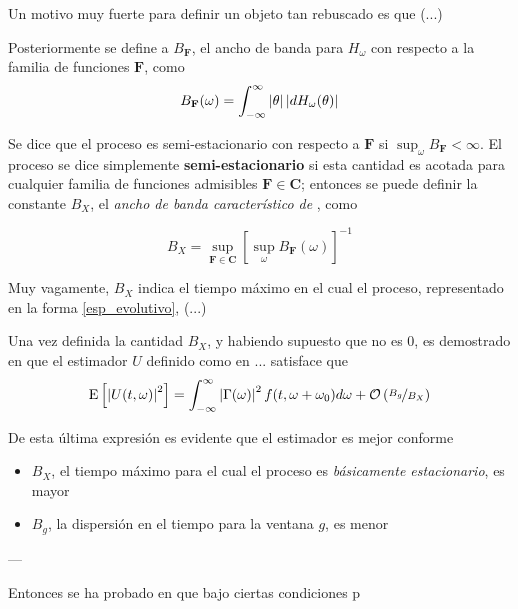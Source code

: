 Un motivo muy fuerte para definir un objeto tan rebuscado es que (...)

Posteriormente se define a $B_{\mathbf{F}}$, el ancho de banda para $H_\omega$ con respecto a la 
familia de funciones $\mathbf{F}$, como
%
\begin{equation}
B_{\mathbf{F}}(\omega) = \int_{-\infty}^{\infty} \left| \theta \right| \left| dH_\omega(\theta) \right|
\end{equation}

Se dice que el proceso es semi-estacionario con respecto a $\mathbf{F}$ si 
$\sup_\omega B_{\mathbf{F}} < \infty$. El proceso se dice simplemente \textbf{semi-estacionario} 
si esta cantidad es acotada para cualquier familia de funciones admisibles 
$\mathbf{F} \in \mathbf{C}$; entonces se puede definir la constante $B_X$, el \textit{ancho de 
banda característico de} \xt, como

\begin{equation}
B_X = \sup_{\mathbf{F}\in \mathbf{C}} \left[ \sup_\omega B_{\mathbf{F}}(\omega) \right]^{-1}
\end{equation}

Muy vagamente, $B_X$ indica el tiempo máximo en el cual el proceso, representado en la forma
\ref{esp_evolutivo}, (...)

Una vez definida la cantidad $B_X$, y habiendo supuesto que no es 0, es demostrado en 
\cite{Priestley65} que el estimador $U$ definido como en ... satisface que
%
\begin{equation}
\mathrm{E}\left[ \left| U(t,\omega) \right|^{2} \right] = \int_{-\infty}^{\infty} \left| \Gamma(\omega) \right|^{2} f(t,\omega+\omega_0) d\omega
+ \mathcal{O}\left( \nicefrac{B_g}{B_X} \right)
\end{equation}

De esta última expresión es evidente que el estimador es mejor conforme 
\begin{itemize}
\item  $B_X$, el tiempo máximo para el cual el proceso es \textit{básicamente estacionario}, es 
mayor
\item $B_g$, la dispersión en el tiempo para la ventana $g$, es menor
\end{itemize}

---

Entonces se ha probado en \cite{Priestley66,Priestley69} que bajo ciertas
condiciones p




